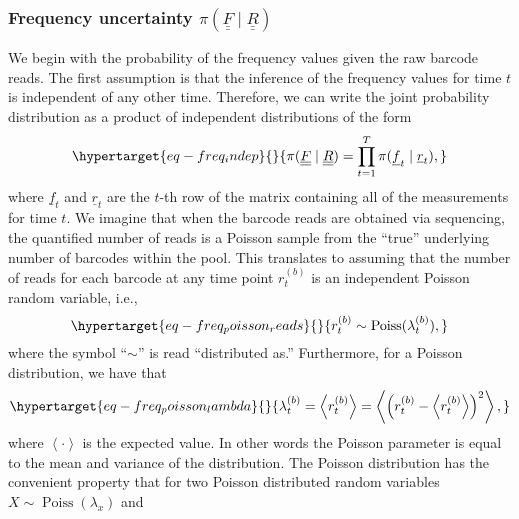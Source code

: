 \documentclass[
]{scrartcl}
\begin{document}
\begin{refsegment}
\hypertarget{sec-bayes_freq}{%
\subsubsection{\texorpdfstring{Frequency uncertainty
\(\pi(\underline{\underline{F}} \mid \underline{\underline{R}})\)}{Frequency uncertainty \textbackslash pi(\textbackslash underline\{\textbackslash underline\{F\}\} \textbackslash mid \textbackslash underline\{\textbackslash underline\{R\}\})}}\label{sec-bayes_freq}}

We begin with the probability of the frequency values given the raw
barcode reads. The first assumption is that the inference of the
frequency values for time \(t\) is independent of any other time.
Therefore, we can write the joint probability distribution as a product
of independent distributions of the form
\begin{equation}\protect\hypertarget{eq-freq_indep}{}{
\pi(\underline{\underline{F}} \mid \underline{\underline{R}}) =
\prod_{t=1}^T \pi(\underline{f}_t \mid \underline{r}_t),
}\label{eq-freq_indep}\end{equation} where \(\underline{f}_t\) and
\(\underline{r}_t\) are the \(t\)-th row of the matrix containing all of
the measurements for time \(t\). We imagine that when the barcode reads
are obtained via sequencing, the quantified number of reads is a Poisson
sample from the ``true'' underlying number of barcodes within the pool.
This translates to assuming that the number of reads for each barcode at
any time point \(r^{(b)}_t\) is an independent Poisson random variable,
i.e., \begin{equation}\protect\hypertarget{eq-freq_poisson_reads}{}{
r^{(b)}_t \sim \operatorname{Poiss}(\lambda^{(b)}_t),
}\label{eq-freq_poisson_reads}\end{equation} where the symbol
``\(\sim\)'' is read ``distributed as.'' Furthermore, for a Poisson
distribution, we have that
\begin{equation}\protect\hypertarget{eq-freq_poisson_lambda}{}{
\lambda^{(b)}_t = \left\langle r^{(b)}_t \right\rangle = 
\left\langle 
    \left( r^{(b)}_t - \left\langle r^{(b)}_t \right\rangle \right)^2
\right\rangle,
}\label{eq-freq_poisson_lambda}\end{equation} where
\(\left\langle \cdot \right\rangle\) is the expected value. In other
words the Poisson parameter is equal to the mean and variance of the
distribution. The Poisson distribution has the convenient property that
for two Poisson distributed random variables
\(X \sim \operatorname{Poiss}(\lambda_x)\) and

\end{refsegment}
\end{document}

